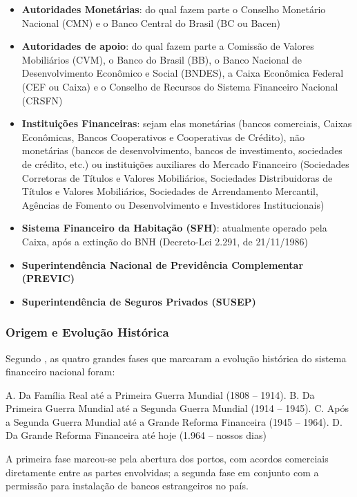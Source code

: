 \documentclass[
	10pt,				%
	openright,			%
	twoside,			%
	a5paper,			%
	english,			%
	french,				%
	spanish,			%
	brazil				%
	]{abntex2}
\begin{document}
\begin{itemize}
\tightlist
\item
  \textbf{Autoridades Monetárias}: do qual fazem parte o Conselho
  Monetário Nacional (CMN) e o Banco Central do Brasil (BC ou Bacen)
\item
  \textbf{Autoridades de apoio}: do qual fazem parte a Comissão de
  Valores Mobiliários (CVM), o Banco do Brasil (BB), o Banco Nacional de
  Desenvolvimento Econômico e Social (BNDES), a Caixa Econômica Federal
  (CEF ou Caixa) e o Conselho de Recursos do Sistema Financeiro Nacional
  (CRSFN)
\item
  \textbf{Instituições Financeiras}: sejam elas monetárias (bancos
  comerciais, Caixas Econômicas, Bancos Cooperativos e Cooperativas de
  Crédito), não monetárias (bancos de desenvolvimento, bancos de
  investimento, sociedades de crédito, etc.) ou instituições auxiliares
  do Mercado Financeiro (Sociedades Corretoras de Títulos e Valores
  Mobiliários, Sociedades Distribuidoras de Títulos e Valores
  Mobiliários, Sociedades de Arrendamento Mercantil, Agências de Fomento
  ou Desenvolvimento e Investidores Institucionais)
\item
  \textbf{Sistema Financeiro da Habitação (SFH)}: atualmente operado
  pela Caixa, após a extinção do BNH (Decreto-Lei 2.291, de 21/11/1986)
\item
  \textbf{Superintendência Nacional de Previdência Complementar
  (PREVIC)}
\item
  \textbf{Superintendência de Seguros Privados (SUSEP)}
\end{itemize}

\subsubsection{Origem e Evolução
Histórica}\label{origem-e-evoluuxe7uxe3o-histuxf3rica}

Segundo , as quatro grandes
fases que marcaram a evolução histórica do sistema financeiro nacional
foram:

A. Da Família Real até a Primeira Guerra Mundial (1808 -- 1914). B. Da
Primeira Guerra Mundial até a Segunda Guerra Mundial (1914 -- 1945). C.
Após a Segunda Guerra Mundial até a Grande Reforma Financeira (1945 --
1964). D. Da Grande Reforma Financeira até hoje (1.964 -- nossos dias)

A primeira fase marcou-se pela abertura dos portos, com acordos
comerciais diretamente entre as partes envolvidas; a segunda fase em
conjunto com a permissão para instalação de bancos estrangeiros no
país.\cite[p.~12]{beatrizselan}
\end{document}
